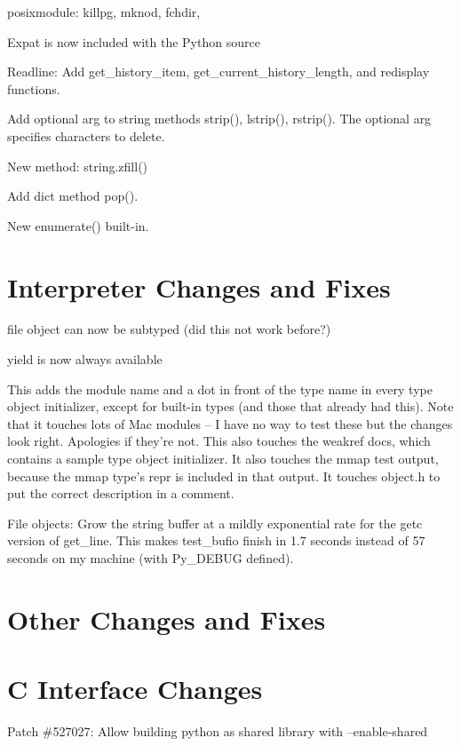 \documentclass{howto}
\begin{document}
posixmodule: killpg, mknod, fchdir, 

Expat is now included with the Python source

Readline: Add get_history_item, get_current_history_length, and
redisplay functions.

Add optional arg to string methods strip(), lstrip(), rstrip().
The optional arg specifies characters to delete.

New method: string.zfill()

Add dict method pop().

New enumerate() built-in.

\section{Interpreter Changes and Fixes}

file object can now be subtyped (did this not work before?)

yield is now always available

This adds the module name and a dot in front of the type name in every
type object initializer, except for built-in types (and those that
already had this).  Note that it touches lots of Mac modules -- I have
no way to test these but the changes look right.  Apologies if they're
not.  This also touches the weakref docs, which contains a sample type
object initializer.  It also touches the mmap test output, because the
mmap type's repr is included in that output.  It touches object.h to
put the correct description in a comment.

File objects: Grow the string buffer at a mildly exponential rate for
the getc version of get_line.  This makes test_bufio finish in 1.7
seconds instead of 57 seconds on my machine (with Py_DEBUG defined).

\section{Other Changes and Fixes}


\section{C Interface Changes}

Patch \#527027: Allow building python as shared library with
--enable-shared
\end{document}
